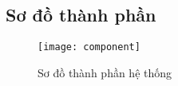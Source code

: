 \subsection{Sơ đồ thành phần}

\begin{figure}[h!]\fontsize{13px}{13px}\selectfont
	\begin{center}	
		\texttt{[image: component]}
		\caption{Sơ đồ thành phần hệ thống}
	\end{center}
\end{figure}